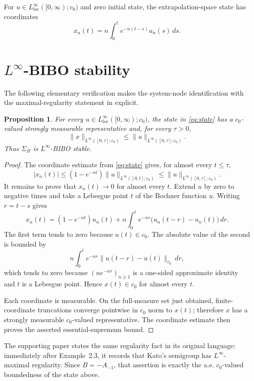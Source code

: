 \documentclass[11pt]{article}
\newtheorem{proposition}[theorem]{Proposition}
\begin{document}
For $u\in L^\infty_{\mathrm{loc}}([0,\infty);c_0)$ and zero initial state,
the extrapolation-space state has coordinates
\begin{equation}\label{eq:state}
 x_n(t)=n\int_0^t e^{-n(t-s)}u_n(s)\,ds.
\end{equation}

\section{$L^\infty$-BIBO stability}

The following elementary verification makes the system-node identification
with the maximal-regularity statement in \cite{support} explicit.

\begin{proposition}\label{prop:bibo}
For every $u\in L^\infty_{\mathrm{loc}}([0,\infty);c_0)$, the state in
\eqref{eq:state} has a $c_0$-valued strongly measurable representative and,
for every $\tau>0$,
\[
 \|x\|_{L^\infty([0,\tau];c_0)}
 \le \|u\|_{L^\infty([0,\tau];c_0)}.
\]
Thus $\Sigma_B$ is $L^\infty$-BIBO stable.
\end{proposition}

\begin{proof}
The coordinate estimate from \eqref{eq:state} gives, for almost every
$t\le\tau$,
\[
 |x_n(t)|\le (1-e^{-nt})
 \|u\|_{L^\infty([0,t];c_0)}
 \le \|u\|_{L^\infty([0,\tau];c_0)}.
\]
It remains to prove that $x_n(t)\to0$ for almost every $t$.  Extend $u$ by
zero to negative times and take a Lebesgue point $t$ of the Bochner function
$u$.  Writing $r=t-s$ gives
\[
 x_n(t)=(1-e^{-nt})u_n(t)
 +n\int_0^t e^{-nr}\bigl(u_n(t-r)-u_n(t)\bigr)\,dr.
\]
The first term tends to zero because $u(t)\in c_0$.  The absolute value of
the second is bounded by
\[
 n\int_0^t e^{-nr}\|u(t-r)-u(t)\|_{c_0}\,dr,
\]
which tends to zero because $(n e^{-nr})_{n\ge1}$ is a one-sided approximate
identity and $t$ is a Lebesgue point.  Hence $x(t)\in c_0$ for almost every
$t$.

Each coordinate is measurable.  On the full-measure set just obtained,
finite-coordinate truncations converge pointwise in $c_0$ norm to $x(t)$;
therefore $x$ has a strongly measurable $c_0$-valued representative.  The
coordinate estimate then proves the asserted essential-supremum bound.
\end{proof}

The supporting paper states the same regularity fact in its original
language: immediately after Example~2.3, it records that Kato's semigroup has
$L^\infty$-maximal regularity.  Since $B=-A_{-1}$, that assertion is exactly
the a.e. $c_0$-valued boundedness of the state above.
\end{document}
